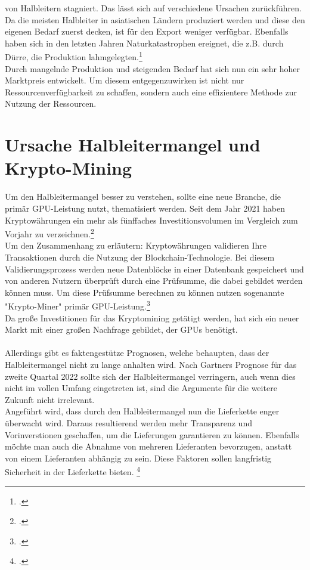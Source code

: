 \documentclass[12pt,toc=bib,toc=listof]{scrreprt}
\begin{document}
von Halbleitern stagniert. Das lässt sich auf verschiedene Ursachen zurückführen. Da die meisten 
Halbleiter in asiatischen Ländern produziert werden und diese den eigenen Bedarf zuerst decken, ist 
für den Export weniger verfügbar. Ebenfalls haben sich in den letzten Jahren Naturkatastrophen ereignet, die
z.B. durch Dürre, die Produktion lahmgelegten.\footcite [Vgl.] []{Voas.2021}
\\
Durch mangelnde Produktion und steigenden Bedarf hat sich nun ein sehr hoher Marktpreis entwickelt. 
Um diesem entgegenzuwirken ist nicht nur Ressourcenverfügbarkeit zu schaffen, sondern auch eine effizientere Methode zur Nutzung
der Ressourcen.

\section{Ursache Halbleitermangel und Krypto-Mining}
\label{sec:Ursache Halbleitermangel und Krypto-Mining}

Um den Halbleitermangel besser zu verstehen, sollte eine neue Branche, die primär GPU-Leistung 
nutzt, thematisiert werden. Seit dem Jahr 2021 haben Kryptowährungen ein mehr als fünffaches Investitionsvolumen
im Vergleich zum Vorjahr zu verzeichnen.\footcite [] [] {Statista_Research_1}
\\Um den Zusammenhang zu erläutern: Kryptowährungen validieren Ihre Transaktionen durch die Nutzung der 
Blockchain-Technologie. Bei diesem Validierungsprozess werden neue Datenblöcke in einer Datenbank gespeichert und von anderen
Nutzern überprüft durch eine Prüfsumme, die dabei gebildet werden können muss. Um diese Prüfsumme berechnen zu können
nutzen sogenannte "Krypto-Miner" primär GPU-Leistung.\footcite [Vgl.] [S.259-273] {Arslanian.2022}
\\Da große Investitionen für das Kryptomining getätigt werden, hat sich ein neuer Markt mit einer großen Nachfrage gebildet, der
GPUs benötigt.
\\ \\
%
Allerdings gibt es faktengestütze Prognosen, welche behaupten, dass der Halbleitermangel nicht zu lange anhalten wird. 
Nach Gartners Prognose für das zweite Quartal 2022 sollte sich der Halbleitermangel verringern, auch wenn dies nicht im vollen Umfang eingetreten ist, sind 
die Argumente für die weitere Zukunft nicht irrelevant.\\
Angeführt wird, dass durch den Halbleitermangel nun die Lieferkette enger überwacht wird.
Daraus resultierend werden mehr Transparenz und Vorinverstionen geschaffen, um die Lieferungen garantieren zu können. 
Ebenfalls möchte man auch die Abnahme von mehreren Lieferanten bevorzugen, anstatt von einem Lieferanten abhängig zu sein.
Diese Faktoren sollen langfristig Sicherheit in der Lieferkette bieten. \footcite [Vgl.] [] {Gartner.2021}
\end{document}
